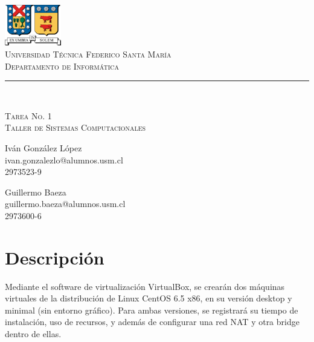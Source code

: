 \documentclass[11pt]{article}
\makeatletter
\newcommand{\labno}{1}
\newcommand{\labtitle}{Taller de Sistemas Computacionales}
\newcommand{\nameone}{Iván González López}
\newcommand{\emailone}{ivan.gonzalezlo@alumnos.usm.cl}
\newcommand{\rolone}{2973523-9}
\newcommand{\nametwo}{Guillermo Baeza}
\newcommand{\emailtwo}{guillermo.baeza@alumnos.usm.cl}
\newcommand{\roltwo}{2973600-6}
\makeatother
\begin{document}
\begin{titlepage}
\begin{center}


\includegraphics[width=70pt]{logos/utfsm.pdf} \\
{\Large \textsc{Universidad Técnica Federico Santa María} \\}
{\Large \textsc{Departamento de Informática} \\ \vspace{4pt}}
{\rule[13pt]{\textwidth}{1pt} \\ \vspace{25pt}}
{\LARGE \textsc{Tarea No. \labno} \\}
{\LARGE \textsc{\labtitle} \\ \vspace{50pt}}

\begin{minipage}{0.4\textwidth}
\begin{flushleft}
{\large \nameone} \\
\emailone \\
\rolone
\end{flushleft}
\end{minipage}
\hfill
\begin{minipage}{0.4\textwidth}
\begin{flushright}
{\large \nametwo} \\
\emailtwo \\
\roltwo
\end{flushright}
\end{minipage}
\end{center}
\end{titlepage}


\section{Descripción}
Mediante el software de virtualización VirtualBox, se crearán dos máquinas virtuales de la distribución de Linux CentOS 6.5 x86, en su versión desktop y minimal (sin entorno gráfico). Para ambas versiones, se registrará su tiempo de instalación, uso de recursos, y además de configurar una red NAT y otra bridge dentro de ellas.   
\end{document}
